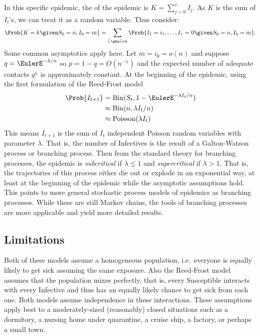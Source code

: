 \documentclass[12pt]{article}
\begin{document}
In this specific epidemic, the  of the epidemic is \(
K=\sum_{j = 0}^{\tau} I_j \).   As \( K \) is the sum of \( I_i \)'s, we
can treat it as a random variable.  Thus  consider:
\[
    \Prob{K=k \given S_0=n,I_0=m}=\sum_{\vec{i}:  \abs \vec{i}=k}\Prob
    {I_1 =i_1,\ldots,I_{\tau}=0 \given S_0=n,I_0=m}.
\] Some common asymptotics apply here.  Let \( m = i_0 = o(n) \) and
suppose \( q = \EulerE^{-\lambda/n} \) so \( p = 1- q = O(n^{-1}) \) and
the expected number of adequate contacts \( q^{i_t} \) is approximately
constant. At the beginning of the epidemic, using the first formulation
of the Reed-Frost model
\begin{align*}
    \Prob{I_{t+1}} &=
    \operatorname{Bin}
    (S_t, 1 - \EulerE^{-\lambda I_t/n}) \\
    &\approx
    \operatorname{Bin}
    (n, \lambda I_t/n) \\
    &\approx
    \operatorname{Poisson}
    (\lambda I_t)
\end{align*}
This means \( I_{t+1} \) is the sum of \( I_t \) independent Poisson
random variables with parameter \( \lambda \).  That is, the number of
Infectives is the result of a Galton-Watson process or branching
process.  Then from the standard theory for branching processes, the
epidemic is \emph{subcritical} if \( \lambda \le 1 \) and \emph{supercritical}
if \( \lambda > 1 \).  That is, the trajectories of this process either
die out or explode in an exponential way, at least at the beginning of
the epidemic while the asymptotic assumptions hold. This points to more
general stochastic process models of epidemics as branching processes.
While these are still Markov chains, the tools of branching processes
are more applicable and yield more detailed results.

\subsection*{Limitations}

Both of these models assume a homogeneous population, i.e.\ everyone is
equally likely to get sick assuming the same exposure.  Also the
Reed-Frost model assumes that the population mixes perfectly, that is,
every Susceptible interacts with every Infective and thus has an equally
likely chance to get sick from each one.  Both models assume
independence in these interactions.  These assumptions apply best to a
moderately-sized (reasonably) closed situations such as a dormitory, a
nursing home under quarantine, a cruise ship, a factory, or perhaps a
small town.
\end{document}
